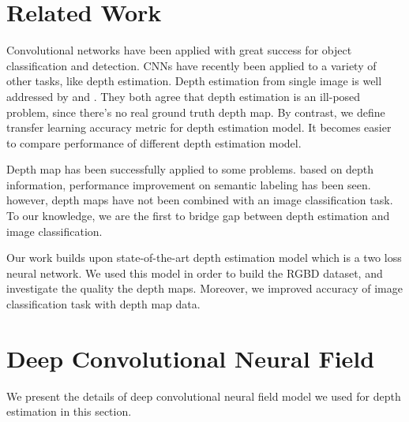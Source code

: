 \documentclass[journal]{IEEEtran}
\begin{document}
	
	
\section{Related Work}
Convolutional networks have been applied with great success for object 
classification and detection. CNNs have recently been applied to a variety 
of other tasks, like depth estimation. Depth estimation from single image is 
well addressed by \cite{liu2015deep} and \cite{eigen2015predicting}. They both agree that depth estimation 
is an ill-posed problem, since there's no real ground truth depth map. By 
contrast, we define transfer learning accuracy metric for depth estimation 
model. It becomes easier to compare performance of different depth estimation 
model.

Depth map has been successfully applied to some problems. based on depth 
information, performance improvement on semantic 
labeling \cite{eigen2015predicting} has been seen. however, depth maps have not
been combined with an image classification task. To our knowledge, we are the first to 
bridge gap between depth estimation and image classification.

Our work builds upon state-of-the-art depth estimation model \cite{liu2015deep}
which is a two loss neural network. We used this model in order to build the RGBD dataset, and investigate the
quality the depth maps. Moreover, we improved 
accuracy of image classification task with depth map data.

\section{Deep Convolutional Neural Field}
We present the details of deep convolutional neural field model we used for 
depth estimation in this section. 
\end{document}
